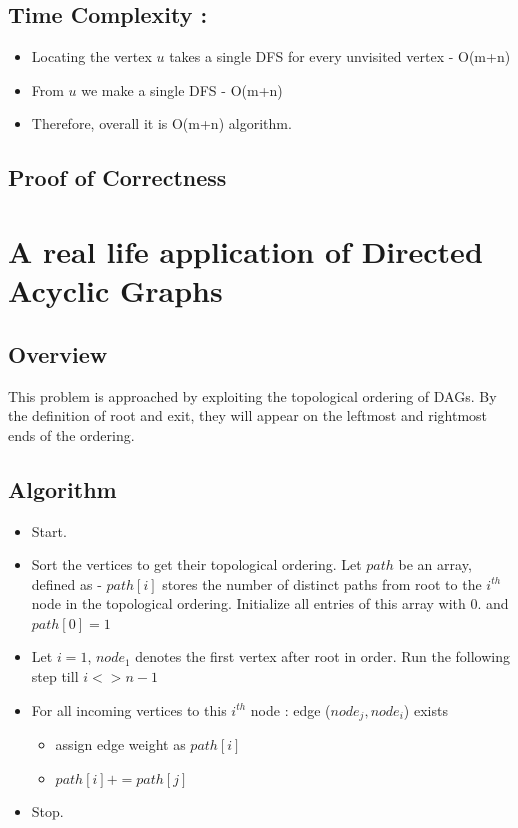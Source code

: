 \documentclass{article}
\begin{document}
\subsection{Time Complexity : }
\begin{itemize}
\item Locating the vertex $u$ takes a single DFS for every unvisited vertex - O(m+n)
\item From $u$ we make a single DFS - O(m+n)
\item Therefore, overall it is O(m+n) algorithm.
\end{itemize}

\subsection{Proof of Correctness}

\newpage
\section{A real life application of Directed Acyclic Graphs}
\subsection{Overview}
This problem is approached by exploiting the topological ordering of DAGs. By the definition of root and exit, they will appear on the leftmost and rightmost ends of the ordering.
\subsection{Algorithm}
\begin{itemize}
\item Start.
\item Sort the vertices to get their topological ordering. Let $path$ be an array, defined as - $path[i]$ stores the number of distinct paths from root to the $i^{th}$ node in the topological ordering. Initialize all entries of this array with $0$. and $path[0] = 1$
\item Let $i=1$, $node_1$ denotes the first vertex after root in order. Run the following step till $i <> n-1$
\item For all incoming vertices to this $i^{th}$ node : edge ($node_j, node_i$) exists
\begin{itemize}
\item assign edge weight as $path[i]$
\item $path[i] += path[j]$
\end{itemize} 
\item Stop.
\end{itemize}
\end{document}
